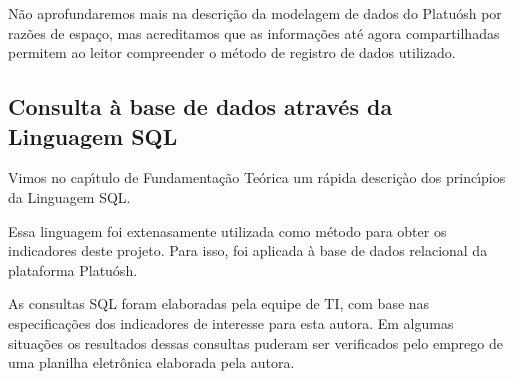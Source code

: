 \documentclass[
12pt,		%
openright,	%
twoside,  %
a4paper,			%
chapter=TITLE,		%
english,			%
french,				%
spanish,			%
brazil				%
]{USPSC-classe/USPSC}
\begin{document}
N\~ao aprofundaremos mais na descri\c{c}\~ao da modelagem de dados do Platu\'osh por raz\~oes de espa\c{c}o, mas acreditamos que as informa\c{c}\~oes at\'e agora compartilhadas permitem ao leitor compreender o m\'etodo de registro de dados utilizado.

















\subsection[Consulta \`a base de dados atrav\'es da Linguagem SQL]{Consulta \`a base de dados atrav\'es da Linguagem SQL}\label{Consulta \`a base de dados atrav\'es da Linguagem SQL}
Vimos no cap\'{\i}tulo de Fundamenta\c{c}\~ao Te\'orica um r\'apida descri\c{c}\`ao dos princ\'{\i}pios da Linguagem SQL.

















Essa linguagem foi extenasamente utilizada como m\'etodo para obter os indicadores deste projeto. Para isso, foi aplicada \`a base de dados relacional da plataforma Platu\'osh.

















As consultas SQL foram elaboradas pela equipe de TI, com base nas especifica\c{c}\~oes dos indicadores de interesse para esta autora. Em algumas situa\c{c}\~oes os resultados dessas consultas puderam ser verificados pelo emprego de uma planilha eletr\^onica elaborada pela autora.
\end{document}
